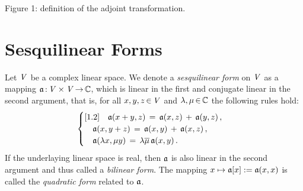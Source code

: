 \documentclass[11pt,twoside]{article}
\begin{document}
\begin{center}

\footnotesize{Figure 1: definition of the adjoint transformation.}
\end{center}

\section{Sesquilinear Forms}
Let $\mathit{V}$ be a complex linear space.
We denote a \textit{sesquilinear form} on $\mathit{V}$
as a mapping $\mathfrak{a} {\,:\,}\mathit{V} \times \mathit{V} {\,\to\,} {\mathbb{C}}$,
which is linear in the first and conjugate linear in the second argument,
that is,
for all $x,y,z {\,\in\,} \mathit{V}$ and $\lambda,\mu {\,\in\,} {\mathbb{C}}$ the following rules hold:
\[
\begin{cases}[1.2]
\quad \mathfrak{a}(x+y,z) \,=\, \mathfrak{a}(x,z) \, + \, \mathfrak{a}(y,z)\,,\\
\quad \mathfrak{a}(x,y+z) \,=\, \mathfrak{a}(x,y) \, + \, \mathfrak{a}(x,z)\,,\\
\quad \mathfrak{a}(\lambda x,\mu y) \,=\,
      \lambda \overline{\mu} \, \mathfrak{a}(x,y)\,.\\
\end{cases}
\]
If the underlaying linear space is real,
then $\mathfrak{a}$ is also linear in the second argument and 
thus called a \textit{bilinear form}.
The mapping $x \mapsto \mathfrak{a}[x] := \mathfrak{a}(x,x)$ is called
the \textit{quadratic form} related to $\mathfrak{a}$.
\end{document}
